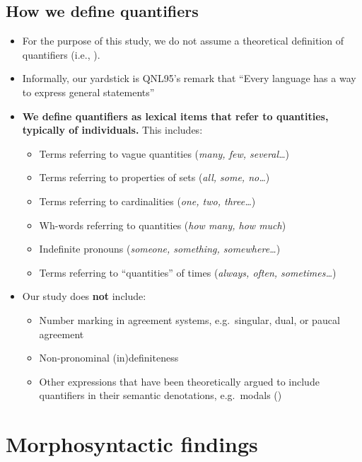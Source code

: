 \documentclass{article}
\begin{document}
\subsection{How we define quantifiers}
\begin{itemize}
\item For the purpose of this study, we do not assume a theoretical definition of quantifiers (i.e., \citealt{heimkratzer98}).
\item Informally, our yardstick is QNL95's remark that ``Every language has a way to express general statements'' %
\item \textbf{We define quantifiers as lexical items that refer to quantities, typically of individuals.}  This includes:
  
  
  \begin{itemize}
  \item Terms referring to vague quantities (\textit{many, few, several\ldots})
  \item Terms referring to properties of sets (\textit{all, some, no\ldots})
  \item Terms referring to cardinalities (\textit{one, two, three\ldots})
  \item Wh-words referring to quantities  (\textit{how many, how much})
  \item Indefinite pronouns (\textit{someone, something, somewhere\ldots})
  \item Terms referring to ``quantities'' of times (\textit{always, often, sometimes\ldots})
  \end{itemize}
\item Our study does \textbf{not} include:
  \begin{itemize}
  \item Number marking in agreement systems, e.g.\ singular, dual, or paucal agreement
  \item Non-pronominal (in)definiteness
  \item Other expressions that have been theoretically argued to include quantifiers in their semantic denotations, e.g.\ modals (\citealt{heimkratzer98})
  \end{itemize}
\end{itemize}


\section{Morphosyntactic findings}
\label{sec:mpsfind}
\end{document}
